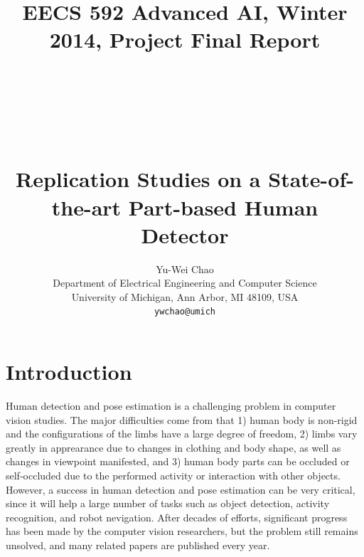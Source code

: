 \documentclass[10pt,twocolumn,letterpaper]{article}
\begin{document}
\title{{\vspace{-30mm}\small EECS 592 Advanced AI, Winter 2014, Project Final Report} \\
~\\
~\\
~\\
~\\
Replication Studies on a State-of-the-art Part-based Human Detector}

\author{Yu-Wei Chao\\
Department of Electrical Engineering and Computer Science \\
University of Michigan, Ann Arbor, MI 48109, USA\\
{\tt\small ywchao@umich}
}

\maketitle


%
%
%
%
%
%
%
%
%
%
%

\section{Introduction}
Human detection and pose estimation is a challenging problem in computer vision studies. The major difficulties come from that 1) human body is non-rigid and the configurations of the limbs have a large degree of freedom, 2) limbs vary greatly in apprearance due to changes in clothing and body shape, as well as changes in viewpoint manifested, and 3) human body parts can be occluded or self-occluded due to the performed activity or interaction with other objects. However, a success in human detection and pose estimation can be very critical, since it will help a large number of tasks such as object detection, activity recognition, and robot nevigation. After decades of efforts, significant progress has been made by the computer vision researchers, but the problem still remains unsolved, and many related papers are published every year.
\end{document}
